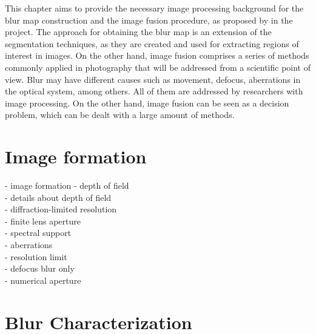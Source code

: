 
{\color{red}
This chapter aims to provide the necessary image processing background for the blur map construction and the image fusion procedure, as proposed by in the project. The approach for obtaining the blur map is an extension of the segmentation techniques, as they are created and used for extracting regions of interest in images. On the other hand, image fusion comprises a series of methods commonly applied in photography that will be addressed from a scientific point of view. Blur may have different causes such as movement, defocus, aberrations in the optical system, among others. All of them are addressed by researchers with image processing. On the other hand, image fusion can be seen as a decision problem, which can be dealt with a large amount of methods.}

\section{Image formation}
\noindent - image formation - depth of field\\
- details about depth of field\\
- diffraction-limited resolution\\
- finite lens aperture\\
- spectral support\\
- aberrations\\
- resolution limit\\
- defocus blur only\\
- numerical aperture\\

\section{Blur Characterization}

